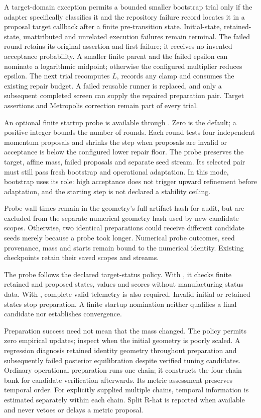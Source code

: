 A target-domain exception permits a bounded smaller bootstrap trial only if
the adapter specifically classifies it and the repository failure record
locates it in a proposal target callback after a finite pre-transition state.
Initial-state, retained-state, unattributed and unrelated execution failures
remain terminal. The failed round retains its original assertion and first
failure; it receives no invented acceptance probability. A smaller finite
parent and the failed epsilon can nominate a logarithmic midpoint; otherwise
the configured multiplier reduces epsilon. The next trial recomputes $L$,
records any clamp and consumes the existing repair budget. A failed reusable
runner is replaced, and only a subsequent completed screen can supply the
repaired preparation pair. Target assertions and Metropolis correction remain
part of every trial.

An optional finite startup probe is available through
. Zero is the
default; a positive integer bounds the number of rounds. Each round tests four
independent momentum proposals and shrinks the step when proposals are invalid
or acceptance is below the configured lower repair floor. The probe preserves
the target, affine mass, failed proposals and separate seed stream. Its selected
pair must still pass fresh bootstrap and operational adaptation. In this mode,
bootstrap uses its  role: high acceptance does not
trigger upward refinement before adaptation, and the starting step is not
declared a stability ceiling.

Probe wall times remain in the geometry's full artifact hash for audit, but are
excluded from the separate numerical geometry hash used by new candidate scopes.
Otherwise, two identical preparations could receive different candidate seeds
merely because a probe took longer. Numerical probe outcomes, seed provenance,
mass and starts remain bound to the numerical identity. Existing checkpoints
retain their saved scopes and streams.

The probe follows the declared target-status policy. With , it checks
finite retained and proposed states, values and scores without manufacturing
status data. With , complete valid telemetry is also
required. Invalid initial or retained states stop preparation. A finite startup
nomination neither qualifies a final candidate nor establishes convergence.

Preparation success need not mean that the mass changed. The
 policy permits zero empirical updates; inspect
 when the initial geometry is poorly
scaled. A regression diagnosis retained identity geometry throughout preparation
and subsequently failed posterior equilibration despite verified tuning
candidates. Ordinary operational preparation runs one chain; it constructs the
four-chain bank for candidate verification afterwards. Its metric assessment
preserves temporal order. For explicitly supplied multiple chains, temporal
information is estimated separately within each chain. Split R-hat is reported
when available and never vetoes or delays a metric proposal.


